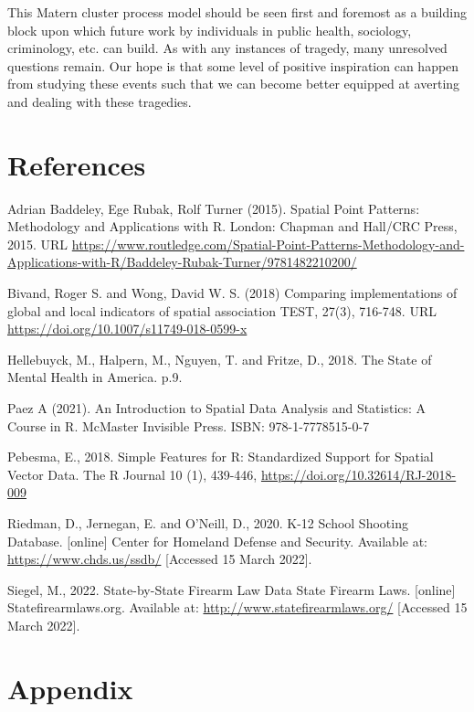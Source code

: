 \documentclass[
  12pt,
]{article}
\begin{document}
This Matern cluster process model should be seen first and foremost as a
building block upon which future work by individuals in public health,
sociology, criminology, etc. can build. As with any instances of
tragedy, many unresolved questions remain. Our hope is that some level
of positive inspiration can happen from studying these events such that
we can become better equipped at averting and dealing with these
tragedies.

\newpage

\hypertarget{references}{%
\section{References}\label{references}}

Adrian Baddeley, Ege Rubak, Rolf Turner (2015). Spatial Point Patterns:
Methodology and Applications with R. London: Chapman and Hall/CRC Press,
2015. URL
\url{https://www.routledge.com/Spatial-Point-Patterns-Methodology-and-Applications-with-R/Baddeley-Rubak-Turner/9781482210200/}

Bivand, Roger S. and Wong, David W. S. (2018) Comparing implementations
of global and local indicators of spatial association TEST, 27(3),
716-748. URL \url{https://doi.org/10.1007/s11749-018-0599-x}

Hellebuyck, M., Halpern, M., Nguyen, T. and Fritze, D., 2018. The State
of Mental Health in America. p.9.

Paez A (2021). An Introduction to Spatial Data Analysis and Statistics:
A Course in R. McMaster Invisible Press. ISBN: 978-1-7778515-0-7

Pebesma, E., 2018. Simple Features for R: Standardized Support for
Spatial Vector Data. The R Journal 10 (1), 439-446,
\url{https://doi.org/10.32614/RJ-2018-009}

Riedman, D., Jernegan, E. and O'Neill, D., 2020. K-12 School Shooting
Database. {[}online{]} Center for Homeland Defense and Security.
Available at: \url{https://www.chds.us/ssdb/} {[}Accessed 15 March
2022{]}.

Siegel, M., 2022. State-by-State Firearm Law Data \textbar{} State
Firearm Laws. {[}online{]} Statefirearmlaws.org. Available at:
\url{http://www.statefirearmlaws.org/} {[}Accessed 15 March 2022{]}.

\newpage

\hypertarget{appendix}{%
\section{Appendix}\label{appendix}}
\end{document}
